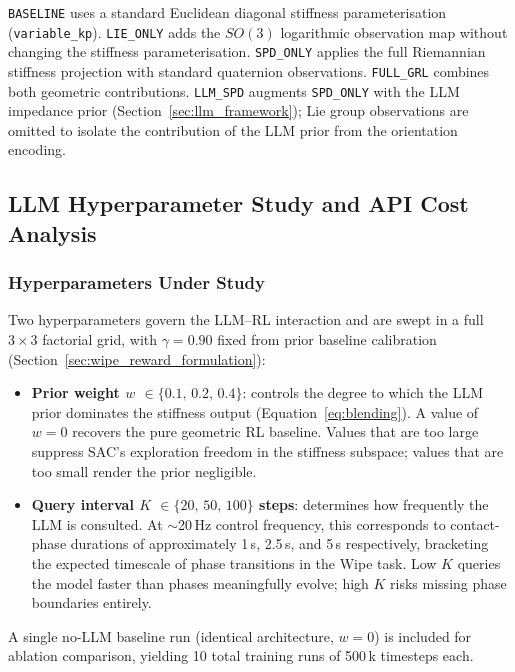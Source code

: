 \documentclass[letterpaper, 10 pt, conference]{IEEEtran}
\begin{document}
\noindent\texttt{BASELINE} uses a standard Euclidean diagonal stiffness parameterisation (\texttt{variable\_kp}).
\texttt{LIE\_ONLY} adds the $SO(3)$ logarithmic observation map without changing the stiffness parameterisation.
\texttt{SPD\_ONLY} applies the full Riemannian stiffness projection with standard quaternion observations.
\texttt{FULL\_GRL} combines both geometric contributions.
\texttt{LLM\_SPD} augments \texttt{SPD\_ONLY} with the LLM impedance prior (Section~\ref{sec:llm_framework}); Lie group observations are omitted to isolate the contribution of the LLM prior from the orientation encoding.

\subsection{LLM Hyperparameter Study and API Cost Analysis}
\label{sec:llm_cost}

\subsubsection{Hyperparameters Under Study}
Two hyperparameters govern the LLM--RL interaction and are swept in a full
$3 \times 3$ factorial grid, with $\gamma = 0.90$ fixed from prior baseline
calibration (Section~\ref{sec:wipe_reward_formulation}):

\begin{itemize}
    \item \textbf{Prior weight $w$ $\in \{0.1,\,0.2,\,0.4\}$}: controls the
    degree to which the LLM prior dominates the stiffness output
    (Equation~\ref{eq:blending}). A value of $w = 0$ recovers the pure
    geometric RL baseline. Values that are too large suppress SAC's
    exploration freedom in the stiffness subspace; values that are
    too small render the prior negligible.

    \item \textbf{Query interval $K$ $\in \{20,\,50,\,100\}$ steps}:
    determines how frequently the LLM is consulted. At $\sim$20\,Hz
    control frequency, this corresponds to contact-phase durations of
    approximately 1\,s, 2.5\,s, and 5\,s respectively, bracketing the
    expected timescale of phase transitions in the Wipe task. Low $K$
    queries the model faster than phases meaningfully evolve; high $K$
    risks missing phase boundaries entirely.
\end{itemize}

A single no-LLM baseline run (identical architecture, $w = 0$) is included
for ablation comparison, yielding 10 total training runs of 500\,k timesteps each.
\end{document}
